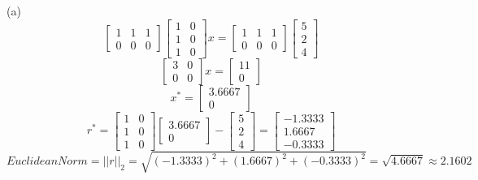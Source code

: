 \documentclass[unicode,11pt,a4paper,oneside,numbers=endperiod,openany]{scrartcl}
\newcommand{\norm}[1]{\lvert\lvert #1 \rvert\rvert}
\begin{document}
\newpage
(a)
\begin{equation*}
\begin{bmatrix}
1 & 1 & 1 \\
0 & 0 & 0
\end{bmatrix}
\begin{bmatrix}
1 & 0 \\
1 & 0 \\
1 & 0
\end{bmatrix}
x = \begin{bmatrix}
1 & 1 & 1 \\
0 & 0 & 0
\end{bmatrix}
\begin{bmatrix}
5 \\
2 \\
4
\end{bmatrix}
\end{equation*}
\begin{equation*}
 \begin{bmatrix}
  3 & 0 \\
  0 & 0
 \end{bmatrix}x=
 \begin{bmatrix}
  11 \\
  0
 \end{bmatrix}
\end{equation*}
\begin{equation*}
 x^* = \begin{bmatrix}
        3.6667 \\
        0
       \end{bmatrix}
\end{equation*}
\begin{equation*}
 r^* = \begin{bmatrix}
        1 & 0 \\
        1 & 0 \\
        1 & 0
       \end{bmatrix}
       \begin{bmatrix}
        3.6667 \\
        0
       \end{bmatrix} -
       \begin{bmatrix}
        5 \\
        2 \\
        4
       \end{bmatrix} =
       \begin{bmatrix}
        -1.3333\\
        1.6667 \\
        -0.3333
       \end{bmatrix}
\end{equation*}
\begin{equation*}
 EuclideanNorm = \norm{r}_2 = \sqrt{(-1.3333)^2 + (1.6667)^2 + (-0.3333)^2} = \sqrt{4.6667} \approx 2.1602
\end{equation*}
\end{document}
